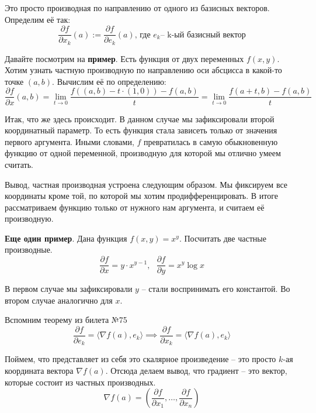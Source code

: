 


\begin{definition} \thmslashn
		
		Это просто производная по направлению от одного из базисных векторов. Определим её так:
		\[
		\frac{\partial f}{\partial x_k} (a) := \frac{\partial f}{\partial e_k} (a)
		\text{, где } e_k \text{-- k-ый базисный вектор}
		\]
		
		Давайте посмотрим на \textbf{пример}. Есть функция от двух переменных $ f(x, y) $. Хотим узнать частную производную по направлению оси абсцисса в какой-то точке $ (a, b) $. Вычислим её по определению:
		\[
		\frac{\partial f}{\partial x} (a, b) =  \lim_{t \to 0} \frac{f((a, b) - t \cdot (1, 0)) - f(a, b)}{t} = 
		\lim_{t \to 0} \frac{f(a + t, b) - f(a, b)}{t}
		\]
		
		Итак, что же здесь происходит. В данном случае мы зафиксировали второй координатный параметр. То есть функция стала зависеть только от значения первого аргумента. Иными словами, $ f $ превратилась в самую обыкновенную функцию от одной переменной, производную для которой мы отлично умеем считать. 
		
		Вывод, частная производная устроена следующим образом. Мы фиксируем все координаты кроме той, по которой мы хотим продифференцировать. В итоге рассматриваем функцию только от нужного нам аргумента, и считаем её производную. 
		
		\textbf{Еще один пример}. Дана функция $ f(x, y) = x^y $. Посчитать две частные производные. 
		\[
		\frac{\partial f}{\partial x} = y \cdot x^{y - 1}, \text{    } 
		\frac{\partial f}{\partial y} = x^y \log{x}
		\]
		
		В первом случае мы зафиксировали $ y $ -- стали воспринимать его константой. Во втором случае аналогично для $ x $.
		
\end{definition}
	
\begin{remark} \thmslashn
		
		Вспомним теорему из билета №75 
		\[
		\frac{\partial f}{\partial e_k} = \langle \nabla f(a), e_k \rangle \implies 
		\frac{\partial f}{\partial x_k} = \langle \nabla f(a), e_k \rangle
		\]
		
		Поймем, что представляет из себя это скалярное произведение -- это просто $ k $-ая координата вектора $ \nabla f(a) $. Отсюда делаем вывод, что градиент -- это вектор, которые состоит  из частных производных. 
		\[
		\nabla f(a) = (\frac{\partial f}{\partial x_1}, \dots, \frac{\partial f}{\partial x_n})
		\]
		
		
\end{remark}
	
